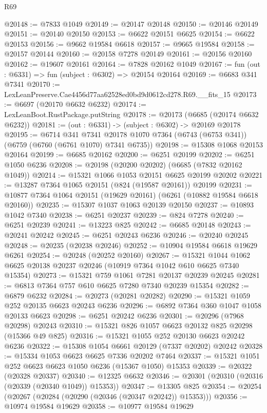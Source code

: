 \begin{lexlean}{R69}
\begin{coremodule}
{@20148 := @7833 @1049
@20149 := @20147 @20148
@20150 := @20146 @20149
@20151 := @20140 @20150
@20153 := @6622 @20151 @6625
@20154 := @6622 @20153
@20156 := @9662 @19584 @6618
@20157 := @9665 @19584
@20158 := @20157 @20144
@20160 := @20158 @7278 @20149
@20161 := @20156 @20160
@20162 := @19607 @20161
@20164 := @7828 @20162 @1049
@20167 := fun (out : @6331) => fun (subject : @6302) => @20154 @20164
@20169 := @6683 @341 @7341
@20170 := LexLeanPreserve.Cae4456d77aa62528ed0bd9d0612cd278.R69.__fits_15
@20173 := @6697 (@20170 @6632 @6232)
@20174 := LexLeanBoot.RustPackage.putString
@20178 := @20173 (@6685 (@20174 @6632 @6232))
@20181 := (out : @6331) -> (subject : @6302) -> @20169 @20178
@20195 := @6714
    @341
    @7341
    @20178
    @1070
    @7364
    (@6743 (@6753 @341))
    (@6759 (@6760 (@6761 @1070) @7341 @6735))
@20198 := @15308 @1068 @20153 @20164
@20199 := @6685 @20162
@20200 := @6251 @20199
@20202 := @6251 @1050 @6236
@20208 := @20198 (@20200 @20202) (@6685 (@7832 @20162 @1049))
@20214 := @15321 @1066 @1053 @20151 @6625 @20199 @20202
@20221 := @13287 @7364 @1065 @20151 (@824 (@19587 @20161)) @20199
@20231 := @10877 @7364 @1064 @20151 (@19629 @20161) (@6261 (@10882 @19584 @6618 @20160))
@20235 := @15307 @1037 @1063 @20139 @20150
@20237 := @10893 @1042 @7340
@20238 := @6251 @20237
@20239 := @824 @7278
@20240 := @6251 @20239
@20241 := @13223 @825
@20242 := @6685 @20148
@20243 := @20241 @20242
@20245 := @6251 @20243 @6236
@20246 := @20240 @20245
@20248 := @20235 (@20238 @20246)
@20252 := @10904 @19584 @6618 @19629 @6261
@20254 := @20248 (@20252 @20160)
@20267 := @15321 @1044 @1062 @6625 @20138 @20237 @20246 (@10919 @7364 @1042 @610 @6625 @7340 @15354)
@20273 := @15321 @759 @1061 @7281 @20137 @20239 @20245
@20281 := @6813 @7364 @757 @610 @6625 @7280 @7340 @20239 @15354
@20282 := @6879 @6232
@20284 := @20273 (@20281 @20282)
@20290 := @15321 @1059 @252 @20135 @6623 @20243 @6236
@20296 := @6892 @7364 @360 @1047 @1058 @20133 @6623
@20298 := @6251 @20242 @6236
@20301 := @20296 (@7968 @20298) @20243
@20310 := @15321 @826 @1057 @6623 @20132 @825 @20298 (@15366 @49 @825)
@20316 := @15321 @1055 @252 @20130 @6623 @20242 @6236
@20322 := @15308 @1054 @6661 @20129 (@7337 @20202) @20242
@20328 := @15334 @1053 @6623 @6625 @7336 @20202 @7464
@20337 := @15321 @1051 @252 @6623 @6623 @1050 @6236 (@15367 @1050) @15353
@20339 := @20322 (@20328 @20337)
@20340 := @12325 @6632
@20346 := @20301 (@20310 (@20316 (@20339 (@20340 @1049)) @15353))
@20347 := @13305 @825
@20354 := @20254 (@20267 (@20284 (@20290 (@20346 (@20347 @20242)) @15353)))
@20356 := @10974 @19584 @19629
@20358 := @10977 @19584 @19629
}
\end{coremodule}
\end{lexlean}
